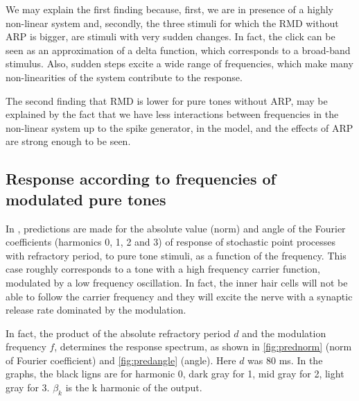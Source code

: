 
We may explain the first finding because, first, we are in presence of a highly 
non-linear system and, 
secondly, the three stimuli for which the RMD without ARP is bigger, 
are stimuli with very sudden changes. 
In fact, the click can be seen as an approximation of a delta function, 
which corresponds to a broad-band stimulus. 
Also, sudden steps excite a wide range of frequencies, 
which make many non-linearities of the system contribute to the response.


The second finding that RMD is lower for pure tones without ARP, 
may be explained by the fact that we have less 
interactions between frequencies in the non-linear system up to the spike generator, 
in the model,
and the effects of ARP are strong enough to be seen.

\subsection{Response according to frequencies of modulated pure tones}

In \cite{Deger}, predictions are made for the absolute value (norm) and angle of the Fourier coefficients 
(harmonics 0, 1, 2 and 3) of response of stochastic point processes with refractory period,
to pure tone stimuli, as a function of the frequency. 
This case roughly corresponds to a tone with a high frequency carrier function, 
modulated by a low frequency oscillation. 
In fact, the inner hair cells will not be able to follow the carrier frequency 
and they will excite the nerve with a synaptic release rate dominated by the modulation.

In fact, the product of the absolute refractory period $d$ and the modulation frequency $f$,
determines the response spectrum, as shown in \autoref{fig:prednorm} (norm of Fourier coefficient) and 
\autoref{fig:predangle} (angle). Here $d$ was 80 ms. 
In the graphs, the black ligns are for harmonic 0, dark gray for 1, mid gray for 2, light gray for 3.
$\beta_k$ is the k harmonic of the output. 


